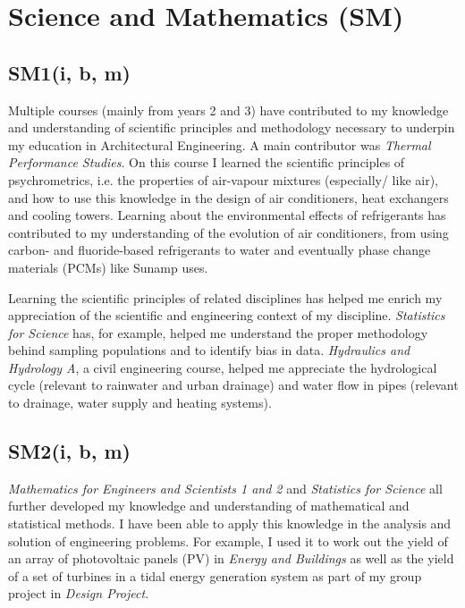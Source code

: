 
\section{Science and Mathematics (SM)}

\subsection*{SM1(i, b, m)}

Multiple courses (mainly from years 2 and 3) have contributed to my knowledge and understanding of scientific principles and methodology necessary to underpin my education in Architectural Engineering.
A main contributor was \textit{Thermal Performance Studies}.
On this course I learned the scientific principles of psychrometrics, i.e. the properties of air-vapour mixtures (especially/ like air), and how to use this knowledge in the design of air conditioners, heat exchangers and cooling towers.
Learning about the environmental effects of refrigerants has contributed to my understanding of the evolution of air conditioners, from using carbon- and fluoride-based refrigerants to water and eventually phase change materials (PCMs) like Sunamp uses.

Learning the scientific principles of related disciplines has helped me enrich my appreciation of the scientific and engineering context of my discipline.
\textit{Statistics for Science} has, for example, helped me understand the proper methodology behind sampling populations and to identify bias in data.
\textit{Hydraulics and Hydrology A}, a civil engineering course, helped me appreciate the hydrological cycle (relevant to rainwater and urban drainage) and water flow in pipes (relevant to drainage, water supply and heating systems).


\subsection*{SM2(i, b, m)}

\textit{Mathematics for Engineers and Scientists 1 and 2} and \textit{Statistics for Science} all further developed my knowledge and understanding of mathematical and statistical methods.
I have been able to apply this knowledge in the analysis and solution of engineering problems.
For example, I used it to work out the yield of an array of photovoltaic panels (PV) in \textit{Energy and Buildings} as well as the yield of a set of turbines in a tidal energy generation system as part of my group project in \textit{Design Project}.


